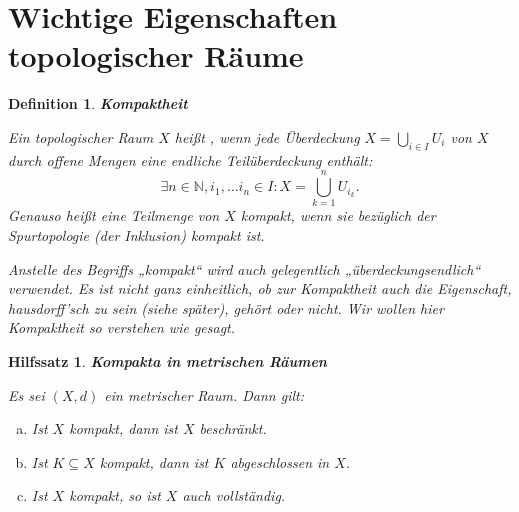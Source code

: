 \documentclass[12pt]{scrbook}   %
\newtheorem{hilfsX}[alles]{Hilfssatz}
\newenvironment{hilfs}[1]{\begin{hilfsX}{\bf #1}\par}{\end{hilfsX}}
\newtheorem{definiX}[alles]{Definition}
\newenvironment{defini}[1]{\begin{definiX}{\bf #1}\par\rm}{\end{definiX}}
\begin{document}
\section{Wichtige Eigenschaften topologischer Räume}
\begin{defini}{Kompaktheit}
Ein topologischer Raum $X$ heißt , wenn
jede Überdeckung $X=\bigcup_{i\in I}U_i$ von $X$ durch offene Mengen eine
endliche Teilüberdeckung enthält: 
$$\exists n\in \mathbb N, i_1,\dots i_n\in I: X=\bigcup_{k=1}^n U_{i_k}.$$
Genauso heißt eine Teilmenge von $X$ kompakt, wenn sie bezüglich der 
Spurtopologie (der Inklusion) kompakt ist.

Anstelle des Begriffs „kompakt“ wird auch gelegentlich 
„überdeckungsendlich“ verwendet. Es ist nicht ganz einheitlich, ob 
zur Kompaktheit auch die Eigenschaft, hausdorff'sch zu sein (siehe später), 
gehört oder 
nicht. Wir wollen hier Kompaktheit so verstehen wie gesagt.
\end{defini}
\begin{hilfs}{Kompakta in metrischen Räumen}
Es sei $(X,d)$ ein metrischer Raum. Dann gilt:
\begin{enumerate}[a)]
\item Ist $X$ kompakt, dann ist $X$ beschränkt.
\item Ist $K\subseteq X$ kompakt, dann ist $K$ abgeschlossen in $X$.
\item Ist $X$ kompakt, so ist $X$ auch vollständig.
\end{enumerate}
\end{hilfs}
\end{document}
